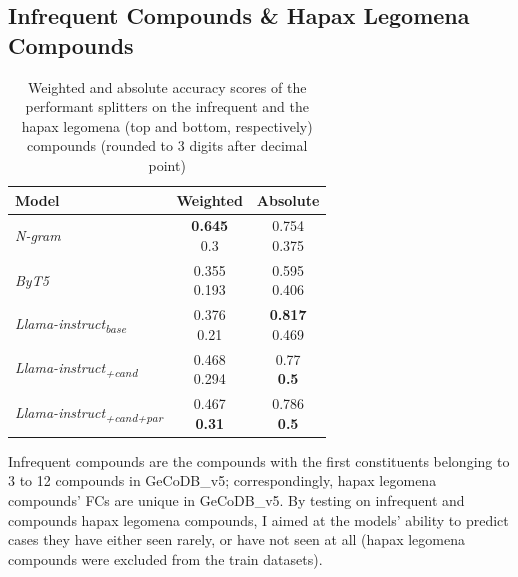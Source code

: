 \documentclass[11pt]{article}
\begin{document}
\subsection{Infrequent Compounds \& Hapax Legomena Compounds}


\begin{table}[htb!]
    \centering
    \renewcommand{\arraystretch}{1.02}
    \begin{tabular}{@{}lcc@{}}
        \toprule
        Model & Weighted & Absolute \\ \midrule
        \textit{N-gram} & \makecell{\textbf{0.645} \\ 0.3} & \makecell{0.754 \\ 0.375} \\ \cmidrule{1-3}
        \textit{ByT5} & \makecell{0.355 \\ 0.193} & \makecell{0.595 \\ 0.406} \\ \midrule
        \textit{Llama-instruct\textsubscript{base}} & \makecell{0.376 \\ 0.21} & \makecell{\textbf{0.817} \\ 0.469} & \\
        \textit{Llama-instruct\textsubscript{+cand}} & \makecell{0.468 \\ 0.294} & \makecell{0.77 \\ \textbf{0.5}} & \\
        \textit{Llama-instruct\textsubscript{+cand+par}} & \makecell{0.467 \\ \textbf{0.31}} & \makecell{0.786 \\ \textbf{0.5}} \\ 
        \bottomrule
    \end{tabular}
    \caption{Weighted and absolute accuracy scores of the performant splitters on the infrequent and the hapax legomena (top and bottom, respectively) compounds (rounded to 3 digits after decimal point)}
    \label{tab:inf_scores}
\end{table}

Infrequent compounds are the compounds with the first constituents belonging to 3 to 12 compounds in GeCoDB\_v5; correspondingly, hapax legomena compounds' FCs are unique in GeCoDB\_v5. By testing on infrequent and compounds hapax legomena compounds, I aimed at the models' ability to predict cases they have either seen rarely, or have not seen at all (hapax legomena compounds were excluded from the train datasets).
\end{document}
